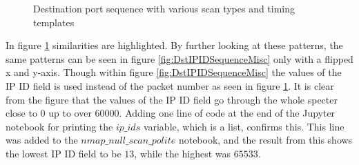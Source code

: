 \begin{figure}[!ht]
    \caption{Destination port sequence with various scan types and timing templates}%
    \label{fig:DstPortSequenceMisc}%
\end{figure}
\vfill
\clearpage

\newpage
\vfill


In figure \ref{fig:DstPortSequenceMisc} similarities are highlighted.
By further looking at these patterns, the same patterns can be seen in figure \ref{fig:DstIPIDSequenceMisc} only with a flipped x and y-axis.
Though within figure \ref{fig:DstIPIDSequenceMisc} the values of the IP ID field is used instead of the packet number as seen in figure \ref{fig:DstPortSequenceMisc}.
It is clear from the figure that the values of the IP ID field go through the whole specter close to 0 up to over 60000.
Adding one line of code at the end of the Jupyter notebook for printing the $ip\_ids$ variable, which is a list, confirms this.
This line was added to the $nmap\_null\_scan\_polite$ notebook, and the result from this shows the lowest IP ID field to be $13$, while the highest was $65533$.

